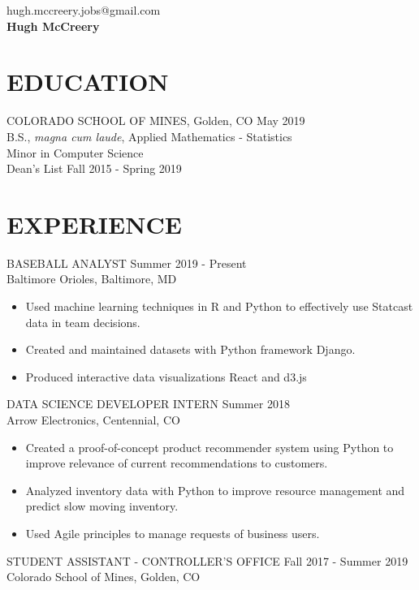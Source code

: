 \documentclass[11pt]{res} %
\begin{document}
 
\begin{multicols}{3}
\noindent \raggedright{hugh.mccreery.jobs@gmail.com}\\ \textbf{\LARGE Hugh McCreery}\\ 
\end{multicols}
\vspace{-0.4in}
\begin{resume}
\vspace{-0.2in}
\hrulefill
\vspace{-0.2in}                                  
\section{EDUCATION} 
 \noindent COLORADO SCHOOL OF MINES, Golden, CO \hfill May 2019 \\
B.S., \textit{magna cum laude}, Applied Mathematics - Statistics\\
Minor in Computer Science \\
Dean's List \hfill Fall 2015 - Spring 2019 \\
\vspace{-0.1in}
\hrulefill
\vspace{-0.1in}  
\section{EXPERIENCE} 
BASEBALL ANALYST \hfill Summer 2019 - Present	\\
Baltimore Orioles, Baltimore, MD

\begin{itemize}
	\item Used machine learning techniques in R and Python to effectively use Statcast data in team decisions.
	\item Created and maintained datasets with Python framework Django.
	\item Produced interactive data visualizations React and d3.js
\end{itemize}
\vspace{-0.15in}  
DATA SCIENCE DEVELOPER INTERN \hfill Summer 2018 \\
Arrow Electronics, Centennial, CO

\begin{itemize}
	\item Created a proof-of-concept product recommender system using Python to improve relevance of current recommendations to customers.
	\item Analyzed inventory data with Python to improve resource management and predict slow moving inventory.
	\item Used Agile principles to manage requests of business users.
\end{itemize}
\vspace{-0.15in}  
STUDENT ASSISTANT - CONTROLLER'S OFFICE \hfill Fall 2017 - Summer 2019 \\
Colorado School of Mines, Golden, CO 


\end{resume}
\end{document}
